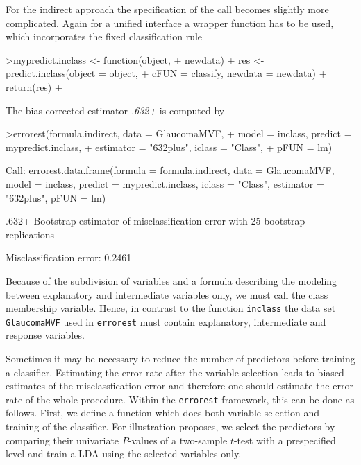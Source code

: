 \documentclass[11pt]{article}
\begin{document}
For the indirect approach the specification of the call becomes 
slightly more complicated. Again for a unified interface a wrapper 
function has to be used, which incorporates the fixed classification rule
\begin{Schunk}
\begin{Sinput}
>mypredict.inclass <- function(object, 
+     newdata) {
+     res <- predict.inclass(object = object, 
+         cFUN = classify, newdata = newdata)
+     return(res)
+ }
\end{Sinput}
\end{Schunk}
The bias corrected estimator {\sl .632+} is computed by 
\begin{Schunk}
\begin{Sinput}
>errorest(formula.indirect, data = GlaucomaMVF, 
+     model = inclass, predict = mypredict.inclass, 
+     estimator = "632plus", iclass = "Class", 
+     pFUN = lm)
\end{Sinput}
\begin{Soutput}
Call:
errorest.data.frame(formula = formula.indirect, data = GlaucomaMVF, 
    model = inclass, predict = mypredict.inclass, iclass = "Class", 
    estimator = "632plus", pFUN = lm)

	 .632+ Bootstrap estimator of misclassification error 
	 with 25 bootstrap replications

Misclassification error:  0.2461 
\end{Soutput}
\end{Schunk}
Because of the subdivision of variables and a formula describing the 
modeling between explanatory and intermediate variables only, 
we must call the class membership variable. Hence, in contrast to the 
function \texttt{inclass} the data set \texttt{GlaucomaMVF} used in 
\texttt{errorest} must contain explanatory, intermediate and response 
variables. 

Sometimes it may be necessary to reduce the number of predictors before
training a classifier. Estimating the error rate after the variable
selection leads to biased estimates of the misclassfication error and
therefore one should estimate the error rate of the whole procedure. Within
the \texttt{errorest} framework, this can be done as follows. First, we define
a function which does both variable selection and training of the
classifier. For illustration proposes, we select the predictors by comparing
their univariate $P$-values of a two-sample $t$-test with a prespecified
level and train a LDA using the selected variables only.
\end{document}
